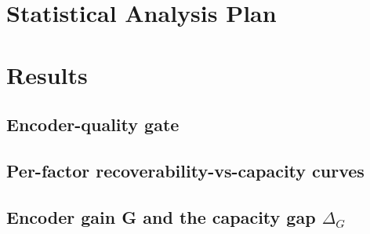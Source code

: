\documentclass[11pt]{article}
\begin{document}
\section{Statistical Analysis Plan}
\label{sec:stats}

\section{Results}
\label{sec:results}

\subsection{Encoder-quality gate}
\subsection{Per-factor recoverability-vs-capacity curves}
\subsection{Encoder gain G and the capacity gap $\Delta_G$}
\end{document}
